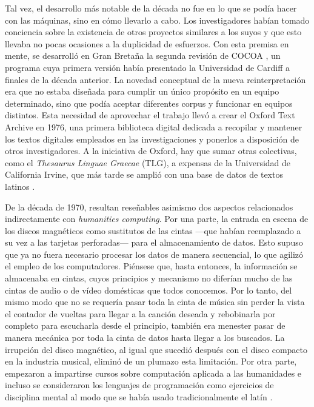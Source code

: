 Tal vez, el desarrollo más notable de la década no fue en lo que se podía hacer con las máquinas, sino en cómo llevarlo a cabo. Los investigadores habían tomado conciencia sobre la existencia de otros proyectos similares a los suyos y que esto llevaba no pocas ocasiones a la duplicidad de esfuerzos. Con esta premisa en mente, se desarrolló en Gran Bretaña la segunda revisión \parencite{berry1973} de COCOA \parencite{russell1967}, un programa cuya primera versión había presentado la Universidad de Cardiff a finales de la década anterior. La novedad conceptual de la nueva reinterpretación era que no estaba diseñada para cumplir un único propósito en un equipo determinado, sino que podía aceptar diferentes corpus y funcionar en equipos distintos. Esta necesidad de aprovechar el trabajo llevó a crear el Oxford Text Archive en 1976, una primera biblioteca digital dedicada a recopilar y mantener los textos digitales empleados en las investigaciones y ponerlos a disposición de otros investigadores. A la iniciativa de Oxford, hay que sumar otras colectivas, como el \textit{Thesaurus Linguae Graecae} (TLG), a expensas de la Universidad de California Irvine, que más tarde se amplió con una base de datos de textos latinos \parencite[8-9]{hockey2004}.

De la década de 1970, resultan reseñables asimismo dos aspectos relacionados indirectamente con \textit{humanities computing}. Por una parte, la entrada en escena de los discos magnéticos como sustitutos de las cintas —que habían reemplazado a su vez a las tarjetas perforadas—  para el almacenamiento de datos. Esto supuso que ya no fuera necesario procesar los datos de manera secuencial, lo que agilizó el empleo de los computadores. Piénsese que, hasta entonces, la información se almacenaba en cintas, cuyos principios y mecanismo no diferían mucho de las cintas de audio o de vídeo domésticas que todos conocemos. Por lo tanto, del mismo modo que no se requería pasar toda la cinta de música sin perder la vista el contador de vueltas para llegar a la canción deseada y rebobinarla por completo para escucharla desde el principio, también era menester pasar de manera mecánica por toda la cinta de datos hasta llegar a los buscados. La irrupción del disco magnético, al igual que sucedió después con el disco compacto en la industria musical, eliminó de un plumazo esta limitación. Por otra parte, empezaron a impartirse cursos sobre computación aplicada a las humanidades e incluso se consideraron los lenguajes de programación como ejercicios de disciplina mental al modo que se había usado tradicionalmente el latín \parencite[9]{hockey2004}.

